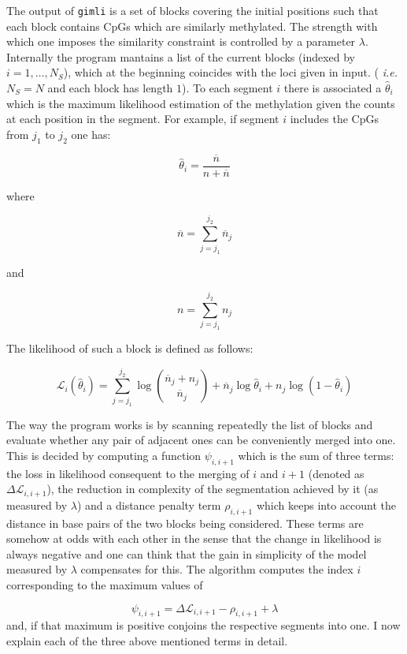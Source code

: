 \documentclass[12pt]{amsart}
\newcommand{\lik}{\ensuremath{\mathcal{L}}}
\newcommand{\gimli}{\texttt{gimli}}
\newcommand{\ie}{\textit{i.e.}}
\begin{document}
The output of \gimli{} is a set of blocks 
covering the initial positions 
such that each block contains CpGs which are similarly
methylated. The strength with which
one imposes the similarity constraint
is controlled by a parameter $\lambda$.
Internally the program  mantains a list of the current  
blocks (indexed by $i=1,\dots,N_S$), 
which at the beginning 
coincides with the loci given in input. 
( \ie{}  $N_S=N$ and each block has length $1$). 
To each segment $i$ there is associated a $\hat{\theta}_i$ which
is the maximum likelihood estimation of the methylation given the counts
at each position in the segment. 
For example, if segment $i$ includes the CpGs from $j_1$ to $j_2$
one has:

\[
\hat{\theta}_i=\frac{\overline{n}}{n + \overline{n}}
\]

where

\[
\overline{n}=\sum_{j=j_1}^{j_2} \overline{n}_j
\]

and

\[
n=\sum_{j=j_1}^{j_2} n_j
\]

The likelihood of such a block is defined as follows:

\begin{equation}
\lik_i(\hat{\theta}_i)=\sum_{j=j_1}^{j_2} 
\log {\overline{n}_j+n_j \choose \overline{n}_j} +
	{\overline{n}_j}\log\hat{\theta}_i+
	n_j\log(1-\hat{\theta}_i)
\end{equation}
\label{loglik}

The way the program works is by 
scanning repeatedly the list of blocks and evaluate whether any pair 
of adjacent ones can be conveniently merged into one.  
This is decided by computing a function $\psi_{i,i+1}$ which is the sum of three terms:
the loss in likelihood consequent to the merging of $i$ and $i+1$ (denoted as $\Delta  \lik_{i,i+1}$),
the reduction in complexity of the segmentation achieved by it (as measured by $\lambda$)
and a distance penalty term $\rho_{i,i+1}$ which keeps into account the distance in base pairs of the two blocks
being considered. These terms are somehow at odds with each other in the
sense that the change in likelihood is always negative and one can think
that the gain in simplicity of the model measured by $\lambda$ 
compensates for this.
The algorithm computes the index $i$ corresponding to the maximum
values of 

\begin{equation}
\psi_{i,i+1} =  \Delta  \lik_{i,i+1}  - \rho_{i,i+1}  +\lambda
\end{equation}
and, if that maximum is positive conjoins the respective segments into one.
I now explain each of the three above mentioned terms in detail.
\end{document}
